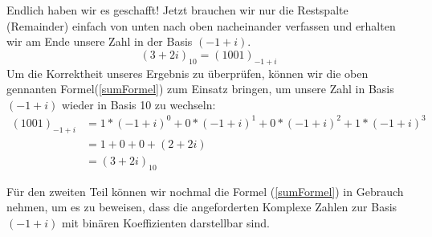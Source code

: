 \documentclass[course=erap]{aspdoc}
\begin{document}
    Endlich haben wir es geschafft! Jetzt brauchen wir nur die Restspalte (Remainder) einfach von unten nach oben nacheinander verfassen und erhalten wir am Ende unsere Zahl in der Basis $(-1+i)$.
    \[(3 + 2i)_{10} = (1001)_{-1+i}\]
    \newline
    Um die Korrektheit unseres Ergebnis zu überprüfen, können wir die oben gennanten Formel(\ref{sumFormel}) zum Einsatz bringen, um unsere Zahl in Basis $(-1+i)$ wieder in Basis 10 zu wechseln:
    \begin{equation*}
        \begin{split}
        (1001)
            _{-1+i} &= 1*(-1+i)^0 + 0*(-1+i)^1 + 0*(-1+i)^2 +1*(-1+i)^3 \\
            &=1 + 0 + 0 + (2 + 2i) \\
            &= (3+2i)_{10}
        \end{split}
    \end{equation*}

    Für den zweiten Teil können wir nochmal die Formel (\ref{sumFormel}) in Gebrauch nehmen, um es zu beweisen, dass die angeforderten Komplexe Zahlen zur Basis $(-1+i)$ mit binären Koeffizienten darstellbar sind.
\end{document}
